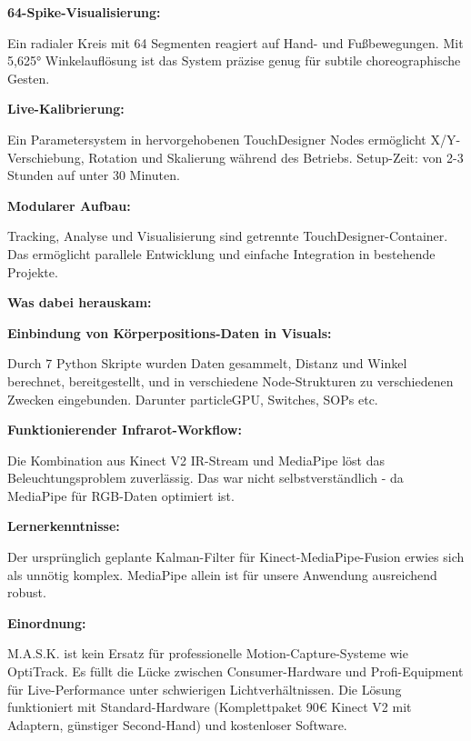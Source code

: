 \textbf{64-Spike-Visualisierung:}
\raggedright Ein radialer Kreis mit 64 Segmenten reagiert auf Hand- und Fußbewegungen. Mit 5,625° Winkelauflösung ist das System präzise genug für subtile choreographische Gesten.

\textbf{Live-Kalibrierung:}
\raggedright Ein Parametersystem in hervorgehobenen TouchDesigner Nodes ermöglicht X/Y-Verschiebung, Rotation und Skalierung während des Betriebs. Setup-Zeit: von 2-3 Stunden auf unter 30 Minuten.

\textbf{Modularer Aufbau:}
\raggedright Tracking, Analyse und Visualisierung sind getrennte TouchDesigner-Container. Das ermöglicht parallele Entwicklung und einfache Integration in bestehende Projekte.

\textbf{Was dabei herauskam:}

\textbf{Einbindung von Körperpositions-Daten in Visuals:}
\raggedright Durch 7 Python Skripte wurden Daten gesammelt, Distanz und Winkel berechnet, bereitgestellt, und in verschiedene Node-Strukturen zu verschiedenen Zwecken eingebunden. Darunter particleGPU, Switches, SOPs etc.

\textbf{Funktionierender Infrarot-Workflow:}
\raggedright Die Kombination aus Kinect V2 IR-Stream und MediaPipe löst das Beleuchtungsproblem zuverlässig. Das war nicht selbstverständlich - da MediaPipe für RGB-Daten optimiert ist.

\textbf{Lernerkenntnisse:}
\raggedright Der ursprünglich geplante Kalman-Filter für Kinect-MediaPipe-Fusion erwies sich als unnötig komplex. MediaPipe allein ist für unsere Anwendung ausreichend robust.

\textbf{Einordnung:}

\raggedright M.A.S.K. ist kein Ersatz für professionelle Motion-Capture-Systeme wie OptiTrack. Es füllt die Lücke zwischen Consumer-Hardware und Profi-Equipment für Live-Performance unter schwierigen Lichtverhältnissen. Die Lösung funktioniert mit Standard-Hardware (Komplettpaket 90€ Kinect V2 mit Adaptern, günstiger Second-Hand) und kostenloser Software.